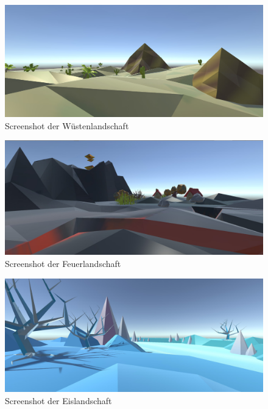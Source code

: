 
\begin{figure}[ht]%
	\centering
		\includegraphics[width=1.0\textwidth]{images/Wueste}
	\caption{Screenshot der Wüstenlandschaft}
	\label{fig:Wueste}
\end{figure}


\begin{figure}[ht]%
	\centering
		\includegraphics[width=1.0\textwidth]{images/Feuer}
	\caption{Screenshot der Feuerlandschaft}
	\label{fig:Feuer}
\end{figure}


\begin{figure}[ht]%
	\centering
		\includegraphics[width=1.0\textwidth]{images/Eis}
	\caption{Screenshot der Eislandschaft}
	\label{fig:Eis}
\end{figure}